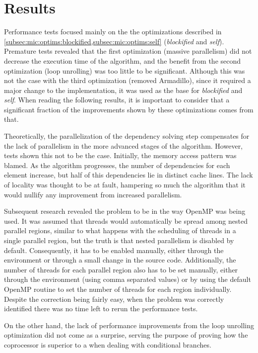 \documentclass[../thesis]{subfiles}
\begin{document}
	\section{Results}
	\label{sec:mic:results}

	Performance tests focused mainly on the the optimizations described in \cref{subsec:mic:optims:blockified,subsec:mic:optims:self} (\emph{blockified} and \emph{self}). Premature tests revealed that the first optimization (massive parallelism) did not decrease the execution time of the algorithm, and the benefit from the second optimization (loop unrolling) was too little to be significant. Although this was not the case with the third optimization (removed Armadillo), since it required a major change to the implementation, it was used as the base for \emph{blockified} and \emph{self}. When reading the following results, it is important to consider that a significant fraction of the improvements shown by these optimizations comes from that.

	Theoretically, the parallelization of the dependency solving step compensates for the lack of parallelism in the more advanced stages of the algorithm. However, tests shown this not to be the case. Initially, the memory access pattern was blamed. As the algorithm progresses, the number of dependencies for each element increase, but half of this dependencies lie in distinct cache lines. The lack of locality was thought to be at fault, hampering so much the algorithm that it would nullify any improvement from increased parallelism.

	Subsequent research \cite{PRACE:MIC:BestPracticeGuide} revealed the problem to be in the way OpenMP was being used. It was assumed that threads would automatically be spread among nested parallel regions, similar to what happens with the scheduling of threads in a single parallel region, but the truth is that nested parallelism is disabled by default. Consequently, it has to be enabled manually, either through the environment or through a small change in the source code. Additionally, the number of threads for each parallel region also has to be set manually, either through the environment (using comma separated values) or by using the default OpenMP routine to set the number of threads for each region individually. Despite the correction being fairly easy, when the problem was correctly identified there was no time left to rerun the performance tests.

	On the other hand, the lack of performance improvements from the loop unrolling optimization did not come as a surprise, serving the purpose of proving how the \intel\xeonphi coprocessor is superior to a \gpu when dealing with conditional branches.
\end{document}
